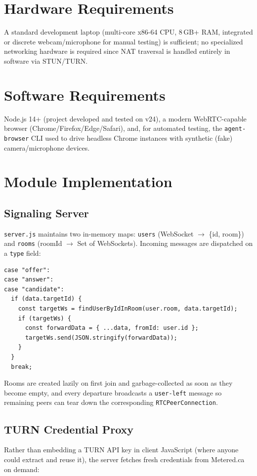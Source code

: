 \documentclass[12pt,a4paper]{report}
\begin{document}
\section{Hardware Requirements}
A standard development laptop (multi-core x86-64 CPU, 8\,GB+ RAM, integrated or discrete
webcam/microphone for manual testing) is sufficient; no specialized networking hardware is
required since NAT traversal is handled entirely in software via STUN/TURN.

\section{Software Requirements}
Node.js 14+ (project developed and tested on v24), a modern WebRTC-capable browser
(Chrome/Firefox/Edge/Safari), and, for automated testing, the \texttt{agent-browser} CLI
used to drive headless Chrome instances with synthetic (fake) camera/microphone devices.

\section{Module Implementation}

\subsection{Signaling Server}
\texttt{server.js} maintains two in-memory maps: \texttt{users} (WebSocket
$\rightarrow$ \{id, room\}) and \texttt{rooms} (roomId $\rightarrow$ Set of WebSockets).
Incoming messages are dispatched on a \texttt{type} field:

\begin{lstlisting}[caption={Per-target signaling relay (server.js)}]
case "offer":
case "answer":
case "candidate":
  if (data.targetId) {
    const targetWs = findUserByIdInRoom(user.room, data.targetId);
    if (targetWs) {
      const forwardData = { ...data, fromId: user.id };
      targetWs.send(JSON.stringify(forwardData));
    }
  }
  break;
\end{lstlisting}

Rooms are created lazily on first join and garbage-collected as soon as they become empty,
and every departure broadcasts a \texttt{user-left} message so remaining peers can tear
down the corresponding \texttt{RTCPeerConnection}.

\subsection{TURN Credential Proxy}
Rather than embedding a TURN API key in client JavaScript (where anyone could extract and
reuse it), the server fetches fresh credentials from Metered.ca on demand:
\end{document}
